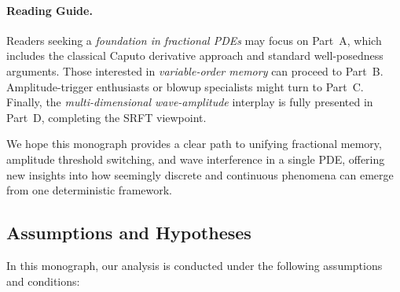 \documentclass[12pt]{article}
\begin{document}
\paragraph{Reading Guide.}
Readers seeking a \emph{foundation in fractional PDEs} may focus on Part~A, which includes 
the classical Caputo derivative approach and standard well-posedness arguments. Those 
interested in \emph{variable-order memory} can proceed to Part~B. 
Amplitude-trigger enthusiasts or blowup specialists might turn to Part~C. 
Finally, the \emph{multi-dimensional wave-amplitude} interplay is fully presented in 
Part~D, completing the SRFT viewpoint.

\medskip

\noindent
We hope this monograph provides a clear path to unifying fractional memory, amplitude 
threshold switching, and wave interference in a single PDE, offering new insights 
into how seemingly discrete and continuous phenomena can emerge from one deterministic 
framework.


\medskip

\subsection*{Assumptions and Hypotheses}
\label{sec:hypotheses}

In this monograph, our analysis is conducted under the following assumptions and conditions:
\end{document}

